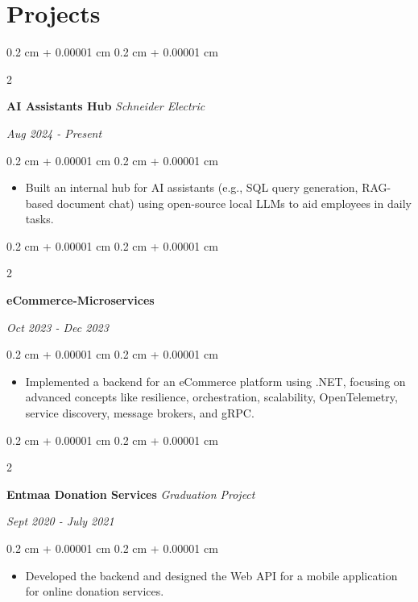 \documentclass[10pt, letterpaper]{article}
\newenvironment{highlights}{ 
\begin{itemize}[ 
 topsep=0.10 cm, 
 parsep=0.10 cm, 
 partopsep=0pt, 
 itemsep=0pt, 
 leftmargin=0.4 cm + 10pt 
] 
 }{ 
\end{itemize} 
 } %
\newenvironment{onecolentry}{ 
\begin{adjustwidth}{ 
 0.2 cm + 0.00001 cm 
}{ 
 0.2 cm + 0.00001 cm 
} 
 }{ 
\end{adjustwidth} 
 } %
\newenvironment{twocolentry}[2][]{ 
\onecolentry 
\def\secondColumn{#2} 
\setcolumnwidth{\fill, 4.5 cm} 
\begin{paracol}{2} 
 }{ 
\switchcolumn \raggedleft \secondColumn 
\end{paracol} 
\endonecolentry 
 } %
\begin{document}
\section{Projects} 

 \begin{twocolentry}{ 
 \textit{Aug 2024 - Present}} 
\textbf{AI Assistants Hub} 
\textit{Schneider Electric} 
 \end{twocolentry} 

 \vspace{0.10 cm} 
 \begin{onecolentry} 
\begin{highlights} 
 \item Built an internal hub for AI assistants (e.g., SQL query generation, RAG-based document chat) using open-source local LLMs to aid employees in daily tasks. 
\end{highlights} 
 \end{onecolentry} 

 \vspace{0.2 cm} 
 \begin{twocolentry}{ 
 \textit{Oct 2023 - Dec 2023}} 
\textbf{eCommerce-Microservices} 
 \end{twocolentry} 

 \vspace{0.10 cm} 
 \begin{onecolentry} 
\begin{highlights} 
 \item Implemented a backend for an eCommerce platform using .NET, focusing on advanced concepts like resilience, orchestration, scalability, OpenTelemetry, service discovery, message brokers, and gRPC. 
\end{highlights} 
 \end{onecolentry} 

 \vspace{0.2 cm} 
 \begin{twocolentry}{ 
 \textit{Sept 2020 - July 2021}} 
\textbf{Entmaa Donation Services} 
\textit{Graduation Project} 
 \end{twocolentry} 

 \vspace{0.10 cm} 
 \begin{onecolentry} 
\begin{highlights} 
 \item Developed the backend and designed the Web API for a mobile application for online donation services. 
\end{highlights} 
 \end{onecolentry} 
\end{document}

